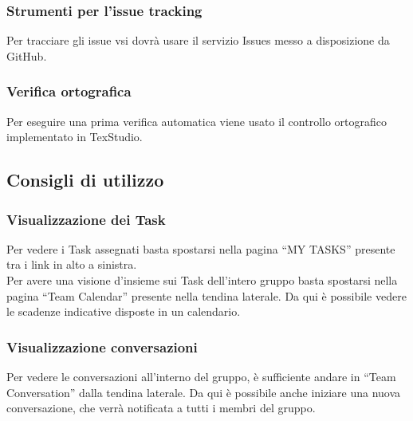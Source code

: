 \documentclass[../NormeDiProgetto.tex]{subfiles}
\begin{document}
		\subsubsection{Strumenti per l'issue tracking}
		Per tracciare gli issue vsi dovrà usare il servizio Issues messo a disposizione da GitHub.
		\subsubsection{Verifica ortografica}
		Per eseguire una prima verifica automatica viene usato il controllo ortografico implementato in TexStudio.
		
		
		
		
		
		
		
		\subsection{Consigli di utilizzo}
			\subsubsection{Visualizzazione dei Task}
				Per vedere i Task assegnati basta spostarsi nella pagina ``MY
				TASKS'' presente tra i link in alto a sinistra.\\
				Per avere una visione d'insieme sui Task dell'intero gruppo basta
				spostarsi nella pagina ``Team Calendar'' presente nella tendina
				laterale. Da qui è possibile vedere le scadenze indicative disposte
				in un calendario.
			\subsubsection{Visualizzazione conversazioni}
				Per vedere le conversazioni all'interno del gruppo, è sufficiente
				andare in ``Team Conversation'' dalla tendina laterale. Da qui è
				possibile anche iniziare una nuova conversazione, che verrà
				notificata a tutti i membri del gruppo.
		
\end{document}
